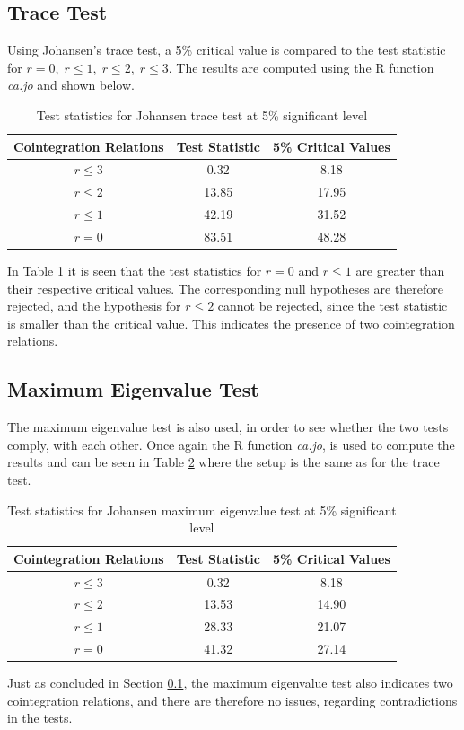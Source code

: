 \subsection{Trace Test}\label{subsec:johansen_trace}
Using Johansen's trace test, a 5\% critical value is compared to the test statistic for $r=0,\;r\leq1,\;r\leq 2,\;r\leq3$.
The results are computed using the R function \textit{ca.jo} and shown below.
\begin{table}[H]
\centering
\begin{tabular}{|c|c|c|}
\hline
\textbf{Cointegration Relations} & \textbf{Test Statistic} & \textbf{5\% Critical Values} \\ \hline
$r \leq 3$ & 0.32  & 8.18  \\ \hline
$r \leq 2$ & 13.85 & 17.95 \\ \hline
$r \leq 1$ & 42.19 & 31.52 \\ \hline
$r = 0$    & 83.51 & 48.28 \\ \hline
\end{tabular}
\caption{Test statistics for Johansen trace test at 5\% significant level}
\label{tab:traceresults}
\end{table}
\noindent In Table \ref{tab:traceresults} it is seen that the test statistics for $r=0$ and $r\leq1$ are greater than their respective critical values. The corresponding null hypotheses are therefore rejected, and the hypothesis for $r\leq2$ cannot be rejected, since the test statistic is smaller than the critical value. This indicates the presence of two cointegration relations.

\subsection{Maximum Eigenvalue Test}
The maximum eigenvalue test is also used, in order to see whether the two tests comply, with each other. Once again the R function \textit{ca.jo}, is used to compute the results and can be seen in Table \ref{tab:maximal_eigenvalue} where the setup is the same as for the trace test.
\begin{table}[H]
\centering
\begin{tabular}{|c|c|c|}
\hline
\textbf{Cointegration Relations} & \textbf{Test Statistic} & \textbf{5\% Critical Values} \\ \hline
$r \leq 3$ & 0.32  & 8.18  \\ \hline
$r \leq 2$ & 13.53 & 14.90 \\ \hline
$r \leq 1$ & 28.33 & 21.07 \\ \hline
$r = 0$    & 41.32 & 27.14 \\ \hline
\end{tabular}
\caption{Test statistics for Johansen maximum eigenvalue test at 5\% significant level}
\label{tab:maximal_eigenvalue}
\end{table}
\noindent Just as concluded in Section \ref{subsec:johansen_trace}, the maximum eigenvalue test also indicates two cointegration relations, and there are therefore no issues, regarding contradictions in the tests.

